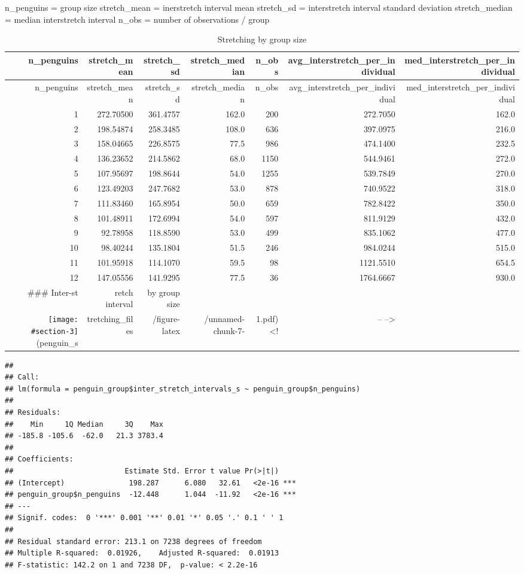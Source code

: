 \documentclass[]{article}
\begin{document}
n\_penguins = group size stretch\_mean = inerstretch interval mean
stretch\_sd = interstretch interval standard deviation stretch\_median =
median interstretch interval n\_obs = number of observations / group

\begin{longtable}[]{@{}rrrrrrr@{}}
\caption{Stretching by group size}\tabularnewline
\toprule
n\_penguins & stretch\_mean & stretch\_sd & stretch\_median & n\_obs &
avg\_interstretch\_per\_individual &
med\_interstretch\_per\_individual\tabularnewline
\midrule
\endfirsthead
\toprule
n\_penguins & stretch\_mean & stretch\_sd & stretch\_median & n\_obs &
avg\_interstretch\_per\_individual &
med\_interstretch\_per\_individual\tabularnewline
\midrule
\endhead
1 & 272.70500 & 361.4757 & 162.0 & 200 & 272.7050 & 162.0\tabularnewline
2 & 198.54874 & 258.3485 & 108.0 & 636 & 397.0975 & 216.0\tabularnewline
3 & 158.04665 & 226.8575 & 77.5 & 986 & 474.1400 & 232.5\tabularnewline
4 & 136.23652 & 214.5862 & 68.0 & 1150 & 544.9461 & 272.0\tabularnewline
5 & 107.95697 & 198.8644 & 54.0 & 1255 & 539.7849 & 270.0\tabularnewline
6 & 123.49203 & 247.7682 & 53.0 & 878 & 740.9522 & 318.0\tabularnewline
7 & 111.83460 & 165.8954 & 50.0 & 659 & 782.8422 & 350.0\tabularnewline
8 & 101.48911 & 172.6994 & 54.0 & 597 & 811.9129 & 432.0\tabularnewline
9 & 92.78958 & 118.8590 & 53.0 & 499 & 835.1062 & 477.0\tabularnewline
10 & 98.40244 & 135.1804 & 51.5 & 246 & 984.0244 & 515.0\tabularnewline
11 & 101.95918 & 114.1070 & 59.5 & 98 & 1121.5510 & 654.5\tabularnewline
12 & 147.05556 & 141.9295 & 77.5 & 36 & 1764.6667 & 930.0\tabularnewline
\#\#\# Inter-st & retch interval & by group size & & & &\tabularnewline
\texttt{[image: \\\#section-3]}(penguin\_s & tretching\_files &
/figure-latex & /unnamed-chunk-7- & 1.pdf)\textless{}! & --
--\textgreater{} &\tabularnewline
\bottomrule
\end{longtable}

\begin{verbatim}
## 
## Call:
## lm(formula = penguin_group$inter_stretch_intervals_s ~ penguin_group$n_penguins)
## 
## Residuals:
##    Min     1Q Median     3Q    Max 
## -185.8 -105.6  -62.0   21.3 3783.4 
## 
## Coefficients:
##                          Estimate Std. Error t value Pr(>|t|)    
## (Intercept)               198.287      6.080   32.61   <2e-16 ***
## penguin_group$n_penguins  -12.448      1.044  -11.92   <2e-16 ***
## ---
## Signif. codes:  0 '***' 0.001 '**' 0.01 '*' 0.05 '.' 0.1 ' ' 1
## 
## Residual standard error: 213.1 on 7238 degrees of freedom
## Multiple R-squared:  0.01926,    Adjusted R-squared:  0.01913 
## F-statistic: 142.2 on 1 and 7238 DF,  p-value: < 2.2e-16
\end{verbatim}
\end{document}
